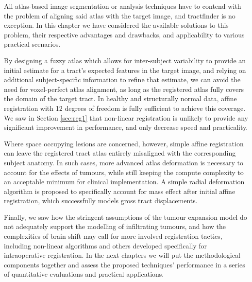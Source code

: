 All atlas-based image segmentation or analysis techniques have to contend with the problem of aligning said atlas with the target image, and tractfinder is no exception.
In this chapter we have considered the available solutions to this problem, their respective advantages and drawbacks, and applicability to various practical scenarios.

By designing a fuzzy atlas which allows for inter-subject variability to provide an initial estimate for a tract's expected features in the target image, and relying on additional subject-specific information to refine that estimate, we can avoid the need for voxel-perfect atlas alignment, as long as the registered atlas fully covers the domain of the target tract.
In healthy and structurally normal data, affine registration with 12 degrees of freedom is fully sufficient to achieve this coverage.
We saw in Section \ref{sec:reg1} that non-linear registration is unlikely to provide any significant improvement in performance, and only decrease speed and practicality.

Where space occupying lesions are concerned, however, simple affine registration can leave the registered tract atlas entirely misaligned with the corresponding subject anatomy.
In such cases, more advanced atlas deformation is necessary to account for the effects of tumours, while still keeping the compute complexity to an acceptable minimum for clinical implementation.
A simple radial deformation algorithm is proposed to specifically account for mass effect after initial affine registration, which successfully models gross tract displacements.

Finally, we saw how the stringent assumptions of the tumour expansion model do not adequately support the modelling of infiltrating tumours, and how the complexities of brain shift may call for more involved registration tactics, including non-linear algorithms and others developed specifically for intraoperative registration.
In the next chapters we will put the methodological components together and assess the proposed techniques' performance in a series of quantitative evaluations and practical applications.
